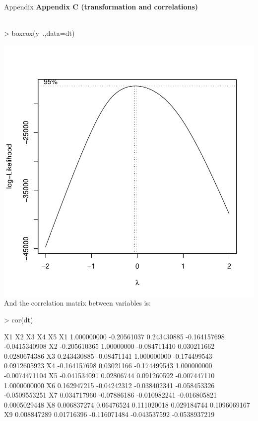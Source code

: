 \documentclass[a4paper,11pt]{article}
\begin{document}
\begin{section}{Appendix}
\textbf{Appendix C (transformation and correlations)}\\\\
\begin{Schunk}
\begin{Sinput}
> boxcox(y~.,data=dt)
\end{Sinput}
\end{Schunk}
\includegraphics{finalReport-plot_plotboxcox}
And the correlation matrix between variables is:
\begin{Schunk}
\begin{Sinput}
> cor(dt)
\end{Sinput}
\begin{Soutput}
              X1          X2           X3           X4            X5
X1   1.000000000 -0.20561037  0.243430885 -0.164157698 -0.0415340908
X2  -0.205610365  1.00000000 -0.084711410  0.030211662  0.0280674386
X3   0.243430885 -0.08471141  1.000000000 -0.174499543  0.0912605923
X4  -0.164157698  0.03021166 -0.174499543  1.000000000 -0.0074471104
X5  -0.041534091  0.02806744  0.091260592 -0.007447110  1.0000000000
X6   0.162947215 -0.04242312 -0.038402341 -0.058453326 -0.0509553251
X7   0.034717960 -0.07886186 -0.010982241 -0.016805821  0.0005029448
X8   0.006837274  0.06476524  0.111020018  0.029184744  0.1096069167
X9   0.008847289  0.01716396 -0.116071484 -0.043537592 -0.0538937219

\end{Soutput}
\end{Schunk}
\end{section}
\end{document}
